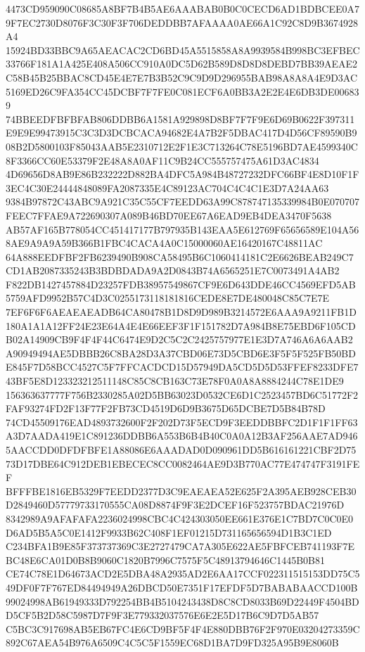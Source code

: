 \documentclass[UTF8,fontset=fandol,zihao=-4,a4paper]{ctexart}
\begin{document}
{{4473CD959090C08685A8BF7B4B5AE6AAABAB0B0C0CECD6AD1BDBCEE0A79F7EC2730D8076F3C30F3F706DEDDBB7AFAAAA0AE66A1C92C8D9B3674928A4
15924BD33BBC9A65AEACAC2CD6BD45A5515858A8A9939584B998BC3EFBEC33766F181A1A425E408A506CC910A0DC5D62B589D8D8D8DEBD7BB39AEAE2
C58B45B25BBAC8CD45E4E7E7B3B52C9C9D9D296955BAB98A8A8A4E9D3AC5169ED26C9FA354CC45DCBF7F7FE0C081ECF6A0BB3A2E2E4E6DB3DE006839
74BBEEDFBFBFAB806DDBB6A1581A929898D8BF7F7F9E6D69B0622F397311E9E9E99473915C3C3D3DCBCACA94682E4A7B2F5DBAC417D4D56CF89590B9
08B2D5800103F85043AAB5E2310712E2F1E3C713264C78E5196BD7AE4599340C8F3366CC60E53379F2E48A8A0AF11C9B24CC555757475A61D3AC4834
4D69656D8AB9E86B232222D882BA4DFC5A984B48727232DFC66BF4E8D10F1F3EC4C30E24444848089FA2087335E4C89123AC704C4C4C1E3D7A24AA63
9384B97872C43ABC9A921C35C55CF7EEDD63A99C878747135339984B0E070707FEEC7FFAE9A722690307A089B46BD70EE67A6EAD9EB4DEA3470F5638
AB57AF165B778054CC451417177B797935B143EAA5E612769F65656589E104A568AE9A9A9A59B366B1FBC4CACA4A0C15000060AE16420167C48811AC
64A888EEDFBF2FB6239490B908CA58495B6C1060414181C2E6626BEAB249C7CD1AB2087335243B3BDBDADA9A2D0843B74A6565251E7C0073491A4AB2
F822DB1427457884D23257FDB38957549867CF9E6D643DDE46CC4569EFD5AB5759AFD9952B57C4D3C0255173118181816CEDE8E7DE480048C85C7E7E
7EF6F6F6AEAEAEADB64CA80478B1D8D9D989B3214572E6AAA9A9211FB1D180A1A1A12FF24E23E64A4E4E66EEF3F1F151782D7A984B8E75EBD6F105CD
B02A14909CB9F4F4F44C6474E9D2C5C2C2425757977E1E3D7A746A6A6AAB2A90949494AE5DBBB26C8BA28D3A37CBD06E73D5CBD6E3F5F5F525FB50BD
E845F7D58BCC4527C5F7FFCACDCD15D57949DA5CD5D5D53FFEF8233DFE743BF5E8D123323212511148C85C8CB163C73E78F0A0A8A8884244C78E1DE9
156363637777F756B2330285A02D5BB63023D0532CE6D1C2523457BD6C51772F2FAF93274FD2F13F77F2FB73CD4519D6D9B3675D65DCBE7D5B84B78D
74CD45509176EAD4893732600F2F202D73F5ECD9F3EEDDBBFC2D1F1F1FF63A3D7AADA419E1C891236DDBB6A553B6B4B40C0A0A12B3AF256AAE7AD946
5AACCDD0DFDFBFE1A88086E6AAADAD0D090961DD5B616161221CBF2D7573D17DBE64C912DEB1EBECEC8CC0082464AE9D3B770AC77E474747F3191FEF
BFFFBE1816EB5329F7EEDD2377D3C9EAEAEA52E625F2A395AEB928CEB30D2849460D57779733170555CA08D8874F9F3E2DCEF16F523757BDAC21976D
8342989A9AFAFAFA2236024998CBC4C424303050EE661E376E1C7BD7C0C0E0D6AD5B5A5C0E1412F9933B62C408F1EF01215D731165656594D1B3C1ED
C234BFA1B9E85F373737369C3E2727479CA7A305E622AE5FBFCEB741193F7EBC48E6CA01D0B8B9060C1820B7996C7575F5C48913794646C1445B0B81
CE74C78E1D64673ACD2E5DBA48A2935AD2E6AA17CCF022311515153DD75C549DF0F7F767ED84494949A26DBCD50E7351F17EFDF5D7BABABAACCD100B
99024998AB61949333D792254BB4B5104243438D8C8CD8033B69D22449F4504BDD5CF5B2D58C5987D7F9F3E779332037576E6E2E5D17B6C9D7D5AB57
C5BC3C917698AB5EB67FC4E6CD9BF5F4F4E880DBB76F2F970E03204273359C892C67AEA54B976A6509C4C5C5F1559EC68D1BA7D9FD325A95B9E8060B
}}
\end{document}
